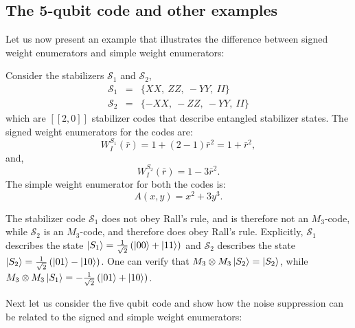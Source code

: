 \documentclass[11pt]{article}
\def\ket#1{\mathinner{|{#1}\rangle}}
\begin{document}
\subsection{The 5-qubit code and other examples}
Let us now present an example that illustrates the difference between signed weight enumerators and simple weight enumerators:
\begin{example}
Consider the stabilizers $\mathcal S_{1}$ and $\mathcal S_{2}$, 
\begin{eqnarray}
\mathcal S_{1} & = & \{XX,~ZZ,~-YY,~II\} \\
\mathcal S_{2} & =& \{-XX,~-ZZ,~-YY,~II\}    
\end{eqnarray}
which are $[[2,0]]$ stabilizer codes that describe entangled stabilizer states.
The signed weight enumerators for the codes are:
\begin{equation}
W^{S_{1}}_{I}(\bar{r})=1+(2-1)\bar{r}^{2}=1+\bar{r}^{2},
\end{equation}
and,
\begin{equation}
W^{S_{2}}_{I}(\bar{r})=1-3\bar{r}^{2}.
\end{equation}
The simple weight enumerator for both the codes is: 
\begin{equation}
A(x,y)=x^{2}+3y^{3}.
\end{equation}

The stabilizer code $\mathcal S_{1}$ does not obey Rall's rule, and is therefore not an $M_{3}$-code, while $\mathcal S_{2}$ is an $M_3$-code, and therefore does obey Rall's rule.  Explicitly, $\mathcal S_{1}$ describes the state $\ket{S_1}=\frac{1}{\sqrt{2}} \left( \ket{00}+\ket{11}\right)$ and $\mathcal S_2$ describes the state $\ket{S_2}=\frac{1}{\sqrt{2}} \left(\ket{01}-\ket{10}\right)$. One can verify that $M_3\otimes M_3 \ket{S_2}=\ket{S_2}$, while $M_3 \otimes M_3 \ket{S_1} = -\frac{1}{\sqrt{2}} \left( \ket{01}+\ket{10}\right)$.
\end{example}
Next let us consider the five qubit code  \cite{MSD} and show how the noise suppression can be related to the signed and simple weight enumerators:
\end{document}
